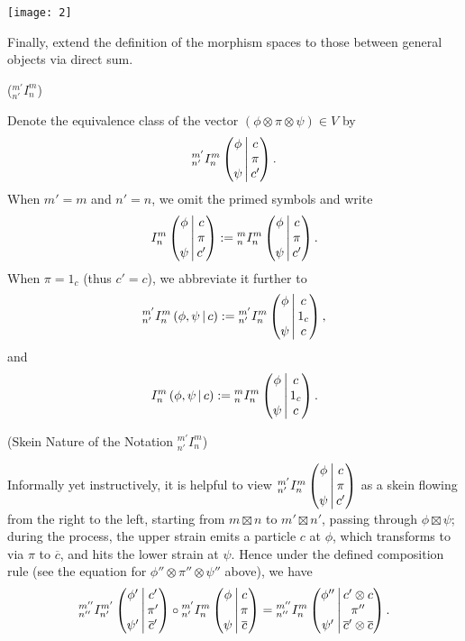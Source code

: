 \begin{definition}
  \begin{center}
    \texttt{[image: 2]}
  \end{center}

  \noindent Finally, extend the definition of the morphism spaces to those between
  general objects via direct sum.

\end{definition}

\begin{notation} (${}^{m'}_{n'}I^{m}_{n}$)

  \noindent Denote the equivalence class of the vector
  $(\phi \otimes \pi \otimes \psi) \in V$ by
  \[\III{m'}{n'}{m}{n}{\phi}{\psi}{c}{\pi}{c'}.\]
  When $m' = m$ and $n' = n$, we omit the primed symbols and write
  \[
    \III{}{}{m}{n}{\phi}{\psi}{c}{\pi}{c'} :=
    \III{m}{n}{m}{n}{\phi}{\psi}{c}{\pi}{c'}.
  \]
  When $\pi = 1_{c}$ (thus $c' = c$), we abbreviate it further to
  \[
    \II{m'}{n'}{m}{n}{\phi}{\psi}{c} :=
    \III{m'}{n'}{m}{n}{\phi}{\psi}{c}{1_{c}}{c},
  \]
  and
  \[
    \II{}{}{m}{n}{\phi}{\psi}{c} :=
    \III{m}{n}{m}{n}{\phi}{\psi}{c}{1_{c}}{c}.
  \]
\end{notation}

\begin{remark}\label{remark/skein-nature-of-the-notation-I} (Skein Nature of the Notation ${}^{m'}_{n'}I^{m}_{n}$)

  \noindent Informally yet instructively, it is helpful to view
  $\III{m'}{n'}{m}{n}{\phi}{\psi}{c}{\pi}{c'}$ as a skein flowing from the right to
  the left, starting from $m \boxtimes n$ to $m' \boxtimes n'$, passing through $\phi \boxtimes \psi$;
  during the process, the upper strain emits a particle $c$ at $\phi$, which
  transforms to via $\pi$ to $\overline{c}$, and hits the lower strain at
  $\psi$. Hence under the defined composition rule (see the equation for
  $\phi'' \otimes \pi'' \otimes \psi''$ above), we have
  \[
    \III{m''}{n''}{m'}{n'}{\phi'}{\psi'}{c'}{\pi'}{\overline{c}'} \circ
    \III{m'}{n'}{m}{n}{\phi}{\psi}{c}{\pi}{\overline{c}} =
    \III{m''}{n''}{m}{n}{\phi''}{\psi'}{c' \otimes c}{\pi''}{\overline{c}' \otimes \overline{c}}.
  \]
\end{remark}

